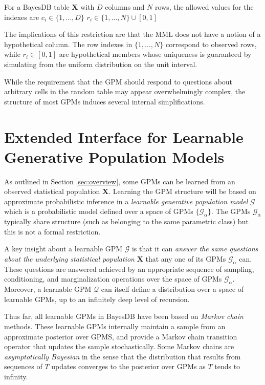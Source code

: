 \documentclass[10pt,letterpaper]{article}
\newcommand{\set}[1]{\{#1\}}
\begin{document}
For a BayesDB table $\mathbf{X}$ with $D$ columns and $N$ rows, the allowed values for the indexes are 
    \subitem $c_i \in \set{1,\dots,D}$
    \subitem $r_i \in \set{1,\dots,N} \cup [0,1]$

The implications of this restriction are that the MML does not have a notion of a hypothetical column. The row indexes in $\set{1,\dots,N}$ correspond to observed rows, while $r_i \in [0,1]$ are hypothetical members whose uniqueness is guaranteed by simulating from the uniform distribution on the unit interval.

While the requirement that the GPM should respond to questions about arbitrary cells in the random table may appear overwhelmingly complex, the structure of most GPMs induces several internal simplifications.

\section{Extended Interface for Learnable Generative Population Models} \label{sec:learnable_gpm}

As outlined in Section \ref{sec:overview}, some GPMs can be learned from an observed statistical population $\mathbf{X}$. Learning the GPM structure will be based on approximate probabilistic inference in a \textit{learnable generative population model} $\mathcal{G}$ which is a probabilistic model defined over a space of GPMs $\set{\mathcal{G_\alpha}}$. The GPMs $\mathcal{G}_\alpha$ typically share structure (such as belonging to the same parametric class) but this is not a formal restriction.

A key insight about a learnable GPM $\mathcal{G}$ is that it can \textit{answer the same questions about the underlying statistical population} $\mathbf{X}$ that any one of its GPMs $\mathcal{G}_\alpha$ can. These questions are answered achieved by an appropriate sequence of sampling, conditioning, and marginalization operations over the space of GPMs $\mathcal{G}_\alpha$. Moreover, a learnable GPM $\mathcal{Q}$ can itself define a distribution over a space of learnable GPMs, up to an infinitely deep level of recursion.

Thus far, all learnable GPMs in BayesDB have been based on \textit{Markov chain} methods. These learnable GPMs internally maintain a sample from an approximate posterior over GPMS, and provide a Markov chain transition operator that updates the sample stochastically. Some Markov chains are \textit{asymptotically Bayesian} in the sense that the distribution that results from sequences of $T$ updates converges to the posterior over GPMs as $T$ tends to infinity.
\end{document}
